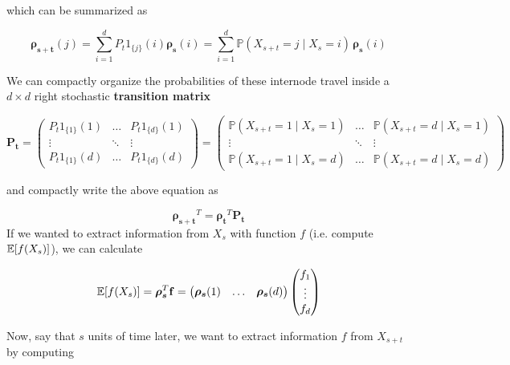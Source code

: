 \begin{example}
		which can be summarized as 

			\begin{equation}
				\boldsymbol{\rho_{s + t}} (j) = \sum_{i = 1}^d P_t 1_{\{j\}} (i) \boldsymbol{\rho_s} (i) = \sum_{i = 1}^d \mathbb{P}(X_{s + t} = j \mid X_s = i) \, \boldsymbol{\rho_s} (i)
			\end{equation}

		We can compactly organize the probabilities of these internode travel inside a $d \times d$ right stochastic \textbf{transition matrix}

			\begin{equation}
				\mathbf{P_t} = \begin{pmatrix} P_t 1_{\{1\}} (1) & \ldots & P_t 1_{\{d\}} (1) \\ \vdots & \ddots & \vdots \\ P_t 1_{\{1\}} (d) & \ldots & P_t 1_{\{d\}} (d) \end{pmatrix} = \begin{pmatrix} \mathbb{P}(X_{s + t} = 1 \mid X_s = 1) & \ldots & \mathbb{P}(X_{s + t} = d \mid X_s = 1) \\ \vdots & \ddots & \vdots \\ \mathbb{P}(X_{s + t} = 1 \mid X_s = d) & \ldots & \mathbb{P}(X_{s + t} = d \mid X_s = d) \end{pmatrix}
			\end{equation}

		and compactly write the above equation as 

			\begin{equation}
				\boldsymbol{\rho_{s + t}}^T = \boldsymbol{\rho_{t}}^T \mathbf{P_t}
			\end{equation}
		\label{ex:markov-property-in-discrete-space}
		If we wanted to extract information from $X_s$ with function $f$ (i.e. compute $\operatorname{\mathbb{E}}[f(X_s)]$), we can calculate 

			\begin{equation}
				\operatorname{\mathbb{E}}[f(X_s)] = \boldsymbol{\rho_s}^T \mathbf{f} =  \begin{pmatrix} \boldsymbol{\rho_s} (1) & \ldots & \boldsymbol{\rho_s} (d) \end{pmatrix} \begin{pmatrix} f_1 \\ \vdots \\ f_d \end{pmatrix}
			\end{equation}
			 

		Now, say that $s$ units of time later, we want to extract information $f$ from $X_{s + t}$ by computing 


\end{example}
